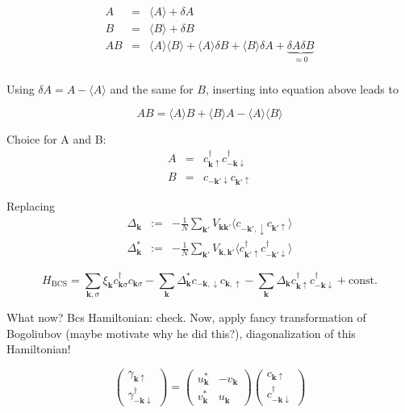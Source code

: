 \begin{eqnarray}
A &=& \langle A \rangle + \delta A \\
B &=& \langle B \rangle + \delta B \\
A B &=& \langle A \rangle  \langle B \rangle  + \langle A \rangle  \delta B +  \langle B \rangle \delta A + \underbrace{\delta A \delta B}_{\approx 0} \\
\end{eqnarray}

Using $\delta A = A - \langle A \rangle $ and the same for $B$, inserting into equation above leads to 

\begin{equation}
AB = \langle A \rangle B + \langle B \rangle A - \langle A \rangle \langle B \rangle
\end{equation}

Choice for A and B:
\begin{eqnarray}
A &=& c^{\dagger}_{\mathbf{k} \uparrow }c^{\dagger}_{- \mathbf{k} \downarrow}    \\
B &=&  c_{- \mathbf{k'} \downarrow} c_{\mathbf{k'} \uparrow}  
\end{eqnarray}

Replacing
\begin{eqnarray}
\Delta_{\mathbf{k}} &:=& - \frac{1}{N} \sum_{\mathbf{k'}} V_\mathbf{{\mathbf{k} \mathbf{k'}}} \langle c_{-\mathbf{k'}, \downarrow} c_{\mathbf{k'} \uparrow} \rangle \\
\Delta_{\mathbf{k}}^* &:=& - \frac{1}{N} \sum_{\mathbf{k'}} V_\mathbf{{\mathbf{k}, \mathbf{k'}}}  \langle  c^{\dagger}_{\mathbf{k'} \uparrow} c^{\dagger}_{- \mathbf{k'} \downarrow} \rangle
\end{eqnarray}

\begin{equation}
H_{\text{BCS}} = \sum_{\mathbf{k}, \sigma} \xi_{\mathbf{k}} c^{\dagger}_{\mathbf{k} \sigma }c_{\mathbf{k} \sigma }    -  \sum_{\mathbf{k}} \Delta_{\mathbf{k}}^* c_{-\mathbf{k}, \downarrow} c_{\mathbf{k}, \uparrow}  - \sum_{\mathbf{k}} \Delta_{\mathbf{k}}  c^{\dagger}_{\mathbf{k} \uparrow} c^{\dagger}_{- \mathbf{k} \downarrow} + \text{const.}
\end{equation}

What now? Bcs Hamiltonian: check. Now, apply fancy transformation of Bogoliubov (maybe motivate why he did this?), diagonalization of this Hamiltonian!

\begin{equation}
\begin{pmatrix}
\gamma_{\mathbf{k} \uparrow} \\ \gamma^{\dagger}_{-\mathbf{k} \downarrow}  
\end{pmatrix} = \begin{pmatrix}
u^*_{\mathbf{k} } & -v_{\mathbf{k} } \\
v^*_{\mathbf{k} }  & u_{\mathbf{k} } 
\end{pmatrix} 
\begin{pmatrix}
c_{\mathbf{k} \uparrow} \\ c^{\dagger}_{-\mathbf{k} \downarrow}  
\end{pmatrix}
\end{equation}

